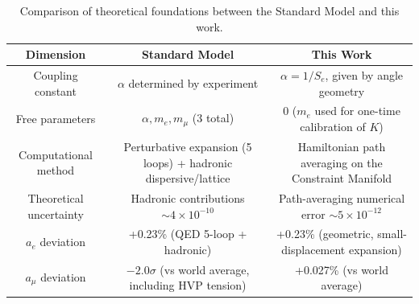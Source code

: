 \documentclass[aps,prd,reprint,nofootinbib]{revtex4-2}
\begin{document}
\begin{table}[t]
\caption{Comparison of theoretical foundations between the Standard Model and this work.}
\label{tab:comparison}
\begin{ruledtabular}
\begin{tabular}{c c c}
\hline
Dimension & Standard Model & This Work \\
\hline
Coupling constant & $\alpha$ determined by experiment & $\alpha = 1/S_e$, given by angle geometry \\
Free parameters & $\alpha, m_e, m_\mu$ (3 total) & 0 ($m_e$ used for one-time calibration of $K$) \\
Computational method & Perturbative expansion (5 loops) + hadronic dispersive/lattice & Hamiltonian path averaging on the Constraint Manifold \\
Theoretical uncertainty & Hadronic contributions $\sim 4 \times 10^{-10}$ & Path-averaging numerical error $\sim 5 \times 10^{-12}$ \\
$a_e$ deviation & +0.23\% (QED 5-loop + hadronic) & +0.23\% (geometric, small-displacement expansion) \\
$a_\mu$ deviation & $-2.0\sigma$ (vs world average, including HVP tension) & +0.027\% (vs world average) \\
\hline
\end{tabular}
\end{ruledtabular}
\end{table}
\end{document}
